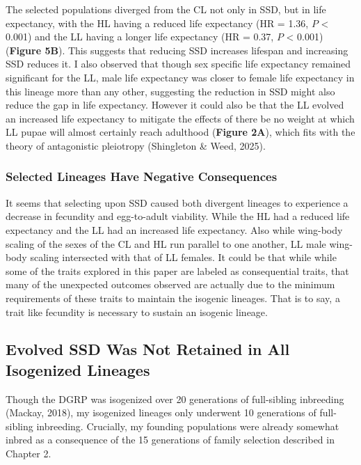 \documentclass[12pt,reqno,oneside]{report}
\begin{document}
The selected populations diverged from the CL not only in SSD, but in life expectancy, with the HL having a reduced life expectancy (HR = 1.36, $P$ < 0.001) and the LL having a longer life expectancy (HR = 0.37, $P$ < 0.001) (\textbf{Figure 5B}). This suggests that reducing SSD increases lifespan and increasing SSD reduces it. I also observed that though sex specific life expectancy remained significant for the LL, male life expectancy was closer to female life expectancy in this lineage more than any other, suggesting the reduction in SSD might also reduce the gap in life expectancy. However it could also be that the LL evolved an increased life expectancy to mitigate the effects of there be no weight at which LL pupae will almost certainly reach adulthood (\textbf{Figure 2A}), which fits with the theory of antagonistic pleiotropy (Shingleton \& Weed, 2025). %

\subsubsection{Selected Lineages Have Negative Consequences}

It seems that selecting upon SSD caused both divergent lineages to experience a decrease in fecundity and egg-to-adult viability. While the HL had a reduced life expectancy and the LL had an increased life expectancy. Also while wing-body scaling of the sexes of the CL and HL run parallel to one another, LL male wing-body scaling intersected with that of LL females. It could be that while while some of the traits explored in this paper are labeled as consequential traits, that many of the unexpected outcomes observed are actually due to the minimum requirements of these traits to maintain the isogenic lineages. That is to say, a trait like fecundity is necessary to sustain an isogenic lineage. %

\subsection{Evolved SSD Was Not Retained in All Isogenized Lineages}

Though the DGRP was isogenized over 20 generations of full-sibling inbreeding (Mackay, 2018), my isogenized lineages only underwent 10 generations of full-sibling inbreeding. Crucially, my founding populations were already somewhat inbred as a consequence of the 15 generations of family selection described in Chapter 2.
\end{document}
